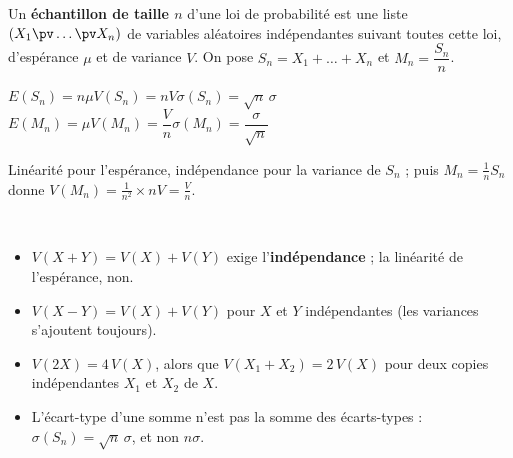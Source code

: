 
\begin{definition}[Échantillon]
Un \textbf{échantillon de taille $n$} d'une loi de probabilité est une liste $(X_1\pv\dots\pv X_n)$ de variables aléatoires
indépendantes suivant toutes cette loi, d'espérance $\mu$ et de variance $V$. On pose $S_n=X_1+\dots+X_n$ et $M_n=\dfrac{S_n}{n}$.
\end{definition}

\noindent
\begin{minipage}[c]{0.56\linewidth}
\begin{theoreme}
\raggedright
$E(S_n)=n\mu$\qquad $V(S_n)=nV$\qquad $\sigma(S_n)=\sqrt n\,\sigma$\\[1.5mm]
$E(M_n)=\mu$\qquad $V(M_n)=\dfrac Vn$\qquad $\sigma(M_n)=\dfrac{\sigma}{\sqrt n}$
\end{theoreme}
\begin{demonstration}
\raggedright
Linéarité pour l'espérance, indépendance pour la variance de $S_n$ ; puis $M_n=\frac1nS_n$ donne $V(M_n)=\frac{1}{n^{2}}\times nV=\frac Vn$.
\end{demonstration}
\end{minipage}\hfill
\begin{minipage}[c]{0.4\linewidth}
\centering
{}\\[0.5mm]
\end{minipage}

\begin{attention}
\begin{itemize}[label={\color{otOrange}\textbullet},leftmargin=1.4em,itemsep=0.6mm,topsep=0.5mm]
  \item $V(X+Y)=V(X)+V(Y)$ exige l'\textbf{indépendance} ; la linéarité de l'espérance, non.
  \item $V(X-Y)=V(X)+V(Y)$ pour $X$ et $Y$ indépendantes (les variances s'ajoutent toujours).
  \item $V(2X)=4\,V(X)$, alors que $V(X_1+X_2)=2\,V(X)$ pour deux copies indépendantes $X_1$ et $X_2$ de $X$.
  \item L'écart-type d'une somme n'est pas la somme des écarts-types : $\sigma(S_n)=\sqrt n\,\sigma$, et non $n\sigma$.
\end{itemize}
\end{attention}

